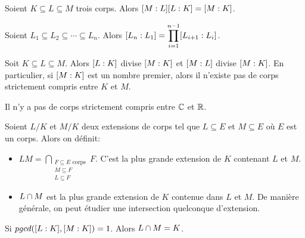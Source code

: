 \begin{proposition} 
	Soient $K \subseteq L \subseteq M$ trois corps. Alors
	$[M : L] [L : K] = [M : K]$.
\end{proposition}

\begin{proposition} 
	Soient $L_{1} \subseteq L_{2} \subseteq \cdots \subseteq L_{n}$.
	Alors $[L_{n} : L_{1}] =
	\displaystyle \prod_{i = 1}^{n - 1} [L_{i + 1} : L_{i}]$.
\end{proposition}

\begin{remarque}
	Soit $K \subseteq L \subseteq M$. Alors $[L : K]$ divise
	$[M : K]$ et $[M : L]$ divise
	$[M : K]$. En particulier, si $[M : K]$ est un
	nombre premier, alors il n'existe pas de corps strictement compris entre $K$
	et $M$.
\end{remarque}

\begin{exercice}
	Il n'y a pas de corps strictement compris entre $\mathbb{C}$ et $\mathbb{R}$.
\end{exercice}

\begin{definition}
	Soient $L/K$ et $M/K$ deux extensions de corps tel que $L \subseteq E$ et $M
	\subseteq E$ où $E$ est un corps. Alors on définit:

	\begin{itemize}
		\item $LM = \displaystyle \bigcap_{\substack{F \subseteq E
				\text{ corps} \\ M \subseteq F \\ L \subseteq F}}
	F$. C'est la plus grande extension de $K$ contenant $L$ et $M$.
		\item $L \cap M$ est la plus grande extension de $K$ contenue dans $L$
			et $M$. De manière générale, on peut étudier une intersection
			quelconque d'extension.
	\end{itemize}
\end{definition}

\begin{exercice}
	Si $pgcd([L : K], [M : K]) = 1$. Alors $L
	\cap M = K$.
\end{exercice}

